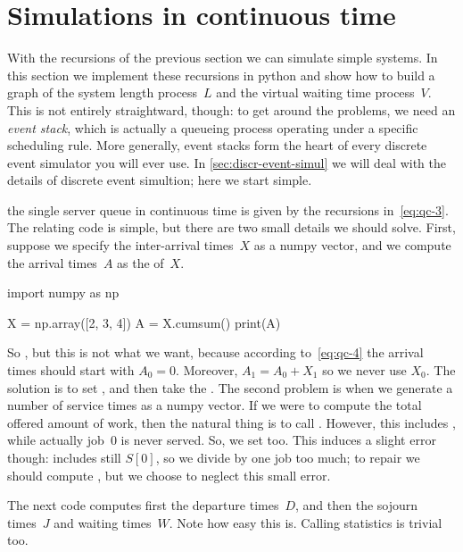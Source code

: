 \documentclass[queueing-book.tex]{subfiles}
\begin{document}
\section{Simulations in continuous time}
\label{sec:simul-cont-time}


With the recursions of the previous section we can simulate simple systems.
In this section we implement these recursions in python and show how to build a graph of the system length process~$L$ and the virtual waiting time process~$V$.
This is not entirely straightward, though: to get around the problems, we need an \emph{event stack}, which is actually a queueing process operating under a specific scheduling rule.
More generally, event stacks form the heart of every discrete event simulator you will ever use.
In \cref{sec:discr-event-simul} we will deal with the details of discrete event simultion; here we start simple.

 the single server queue in continuous time is given by the recursions in~\cref{eq:qc-3}.
The relating code is simple, but there are two small details we should solve.
First, suppose we specify the inter-arrival times~$X$ as a numpy vector, and we compute the arrival times~$A$ as the  of~$X$.
\begin{python}
import numpy as np

X = np.array([2, 3, 4])
A = X.cumsum()
print(A)
\end{python}
So , but this is not what we want, because according to~\cref{eq:qc-4} the arrival times should start with $A_{0}=0$.
Moreover, $A_{1} = A_0 + X_{1}$ so we never use $X_{0}$.
The solution is to set , and then take the .
The second problem is when we generate a number of service times as a numpy vector.
If we were to compute the total offered amount of work, then the natural thing is to call .
However, this includes , while actually job~$0$ is never served.
So, we set  too. This induces a slight error though:  includes still $S[0]$, so we divide by one job too much; to repair we should compute , but we choose to neglect this small error.

The next code computes first the departure times~$D$, and then the sojourn times~$J$ and waiting times~$W$. Note how easy this is. Calling statistics is trivial too.
\end{document}
